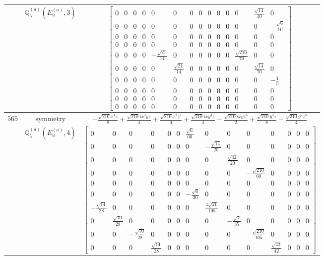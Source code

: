\documentclass[fleqn,8pt,landscape]{jsarticle}
\begin{document}
\begin{longtable}{ccc}
$  $ & $ \mathbb{Q}_{5}^{(a)}(E_{u}^{(a)},3) $ & $ \begin{bmatrix} 0 & 0 & 0 & 0 & 0 & 0 & 0 & 0 & 0 & 0 & 0 & 0 & \frac{\sqrt{14}}{10} & 0 \\ 0 & 0 & 0 & 0 & 0 & 0 & 0 & 0 & 0 & 0 & 0 & 0 & 0 & - \frac{\sqrt{6}}{10} \\ 0 & 0 & 0 & 0 & 0 & 0 & 0 & 0 & 0 & 0 & 0 & 0 & 0 & 0 \\ 0 & 0 & 0 & 0 & 0 & 0 & 0 & 0 & 0 & 0 & 0 & 0 & 0 & 0 \\ 0 & 0 & 0 & 0 & - \frac{\sqrt{21}}{14} & 0 & 0 & 0 & 0 & 0 & 0 & \frac{\sqrt{210}}{70} & 0 & 0 \\ 0 & 0 & 0 & 0 & 0 & \frac{\sqrt{21}}{14} & 0 & 0 & 0 & 0 & 0 & 0 & \frac{\sqrt{14}}{70} & 0 \\ 0 & 0 & 0 & 0 & 0 & 0 & 0 & 0 & 0 & 0 & 0 & 0 & 0 & - \frac{1}{5} \\ 0 & 0 & 0 & 0 & 0 & 0 & 0 & 0 & 0 & 0 & 0 & 0 & 0 & 0 \\ 0 & 0 & 0 & 0 & 0 & 0 & 0 & 0 & 0 & 0 & 0 & 0 & 0 & 0 \\ 0 & 0 & 0 & 0 & 0 & 0 & 0 & 0 & 0 & 0 & 0 & 0 & 0 & 0 \end{bmatrix} $ \\ \hline
$ 565 $ & $ \text{symmetry} $ & $ - \frac{\sqrt{210} x^{4} z}{8} + \frac{\sqrt{210} i x^{3} y z}{4} + \frac{\sqrt{210} x^{2} z^{3}}{4} + \frac{\sqrt{210} i x y^{3} z}{4} - \frac{\sqrt{210} i x y z^{3}}{2} + \frac{\sqrt{210} y^{4} z}{8} - \frac{\sqrt{210} y^{2} z^{3}}{4} $ \\
$  $ & $ \mathbb{Q}_{5}^{(a)}(E_{u}^{(a)},4) $ & $ \begin{bmatrix} 0 & 0 & 0 & 0 & 0 & 0 & \frac{\sqrt{6}}{60} & 0 & 0 & 0 & 0 & 0 & 0 & 0 \\ 0 & 0 & 0 & 0 & 0 & 0 & 0 & - \frac{\sqrt{14}}{20} & 0 & 0 & 0 & 0 & 0 & 0 \\ 0 & 0 & 0 & 0 & 0 & 0 & 0 & 0 & \frac{\sqrt{42}}{20} & 0 & 0 & 0 & 0 & 0 \\ 0 & 0 & 0 & 0 & 0 & 0 & 0 & 0 & 0 & - \frac{\sqrt{210}}{60} & 0 & 0 & 0 & 0 \\ 0 & 0 & 0 & 0 & 0 & 0 & 0 & 0 & 0 & 0 & 0 & 0 & 0 & 0 \\ 0 & 0 & 0 & 0 & 0 & 0 & - \frac{\sqrt{6}}{30} & 0 & 0 & 0 & 0 & 0 & 0 & 0 \\ - \frac{\sqrt{14}}{28} & 0 & 0 & 0 & 0 & 0 & 0 & \frac{4 \sqrt{21}}{105} & 0 & 0 & 0 & 0 & 0 & 0 \\ 0 & \frac{\sqrt{70}}{28} & 0 & 0 & 0 & 0 & 0 & 0 & - \frac{\sqrt{7}}{35} & 0 & 0 & 0 & 0 & 0 \\ 0 & 0 & - \frac{\sqrt{70}}{28} & 0 & 0 & 0 & 0 & 0 & 0 & - \frac{\sqrt{210}}{105} & 0 & 0 & 0 & 0 \\ 0 & 0 & 0 & \frac{\sqrt{14}}{28} & 0 & 0 & 0 & 0 & 0 & 0 & \frac{\sqrt{42}}{42} & 0 & 0 & 0 \end{bmatrix} $ \\ \hline

\end{longtable}
\end{document}
